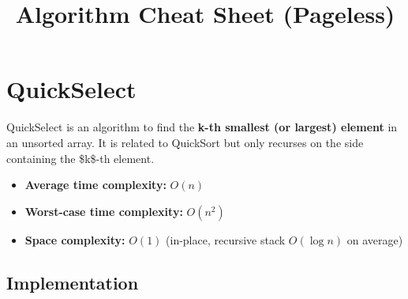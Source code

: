 \documentclass[12pt]{article}
\begin{document}
\title{Algorithm Cheat Sheet (Pageless)}
\author{}
\date{}
\maketitle

\tableofcontents
\vspace{2em}

\section{QuickSelect}

QuickSelect is an algorithm to find the \textbf{k-th smallest (or largest) element} in an unsorted array.  
It is related to QuickSort but only recurses on the side containing the \$k\$-th element.

\begin{itemize}
    \item \textbf{Average time complexity:} $O(n)$
    \item \textbf{Worst-case time complexity:} $O(n^2)$
    \item \textbf{Space complexity:} $O(1)$ (in-place, recursive stack $O(\log n)$ on average)
\end{itemize}

\subsection{Implementation}
\end{document}
